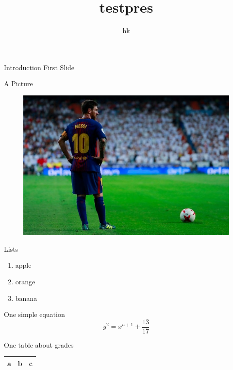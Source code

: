 \documentclass[11pt]{beamer}
\author{hk}
\title{testpres}
\begin{document}
	
	\begin{frame}
		\frametitle{}
	\end{frame}
	
	\begin{frame}{Introduction}
		First Slide
	\end{frame}
	
	\begin{frame}{A Picture}
		\begin{figure}
			\centering
			\includegraphics[width=0.9\linewidth]{messi.jpg}
		\end{figure}
	\end{frame}
	
	\begin{frame}{Lists}
		\begin{enumerate}
			\item apple
			\item orange
			\item banana
		\end{enumerate}
	\end{frame}	
	\begin{frame}{One simple equation}
		$$ y^2 = x^{n+1} + \frac{13}{17}$$
	\end{frame}	
	
	\begin{frame}{One table about grades}
		\begin{center}
		    \begin{tabular}{|c|c|c|}
		    	\hline
		        a & b & c \\
		        \hline
		    \end{tabular}
		\end{center}
	\end{frame}		
\end{document}

